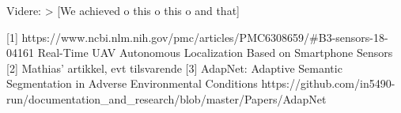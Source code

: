 \begin{introduction}
Videre:
>	 [We  achieved 
o	this
o	this
o	and that]



[1] https://www.ncbi.nlm.nih.gov/pmc/articles/PMC6308659/#B3-sensors-18-04161 
Real-Time UAV Autonomous Localization Based on Smartphone Sensors
[2] Mathias’ artikkel, evt tilsvarende
[3] AdapNet: Adaptive Semantic Segmentation in Adverse Environmental Conditions
https://github.com/in5490-run/documentation_and_research/blob/master/Papers/AdapNet%

\end{introduction}


